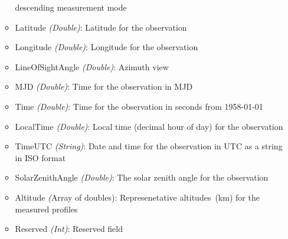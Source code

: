 \begin{itemize}
\begin{itemize}
                descending measurement mode
            \item Latitude \emph{(Double)}: Latitude for the observation
            \item Longitude \emph{(Double)}: Longitude for the observation
            \item LineOfSightAngle \emph{(Double)}: Azimuth view
            \item MJD \emph{(Double)}: Time for the observation in MJD
            \item Time \emph{(Double)}: Time for the observation in seconds
                from 1958-01-01
            \item LocalTime \emph{(Double)}: Local time (decimal hour of day)
                for the observation
            \item TimeUTC \emph{(String)}: Date and time for the observation in
                UTC as a string in ISO format
            \item SolarZenithAngle \emph{(Double)}: The solar zenith angle for
                the observation
            \item Altitude \emph({Array of doubles}): Represenetative
                altitudes~(km) for the measured profiles
            \item Reserved \emph{(Int)}: Reserved field
        \end{itemize}
\end{itemize}




